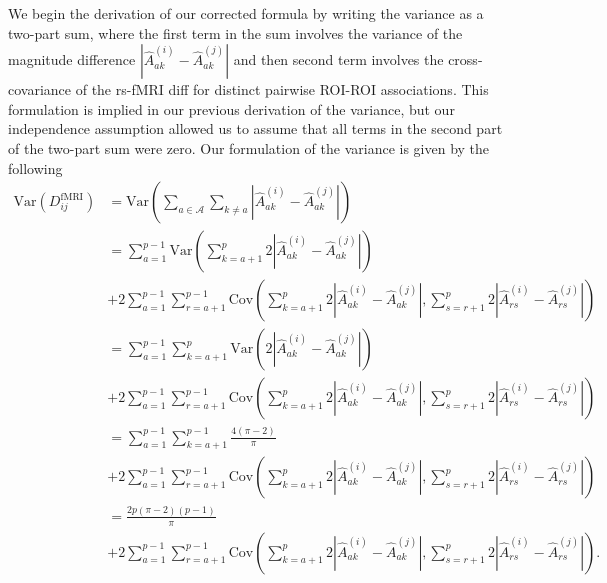 \documentclass[10pt,letterpaper]{article}
\begin{document}
We begin the derivation of our corrected formula by writing the variance as a two-part sum, where the first term in the sum involves the variance of the magnitude difference $|\hat{A}^{(i)}_{ak} - \hat{A}^{(j)}_{ak}|$ and then second term involves the cross-covariance of the rs-fMRI diff for distinct pairwise ROI-ROI associations. This formulation is implied in our previous derivation of the variance, but our independence assumption allowed us to assume that all terms in the second part of the two-part sum were zero. Our formulation of the variance is given by the following
%
\begin{equation}\label{eq:var_DDistr_rs-fMRI}
\begin{aligned}
\text{Var}(D^\text{fMRI}_{ij}) &= \text{Var}\left(\sum_{a \in \mathcal{A}} \sum_{k \neq a} \left|\hat{A}^{(i)}_{ak} - \hat{A}^{(j)}_{ak}\right|\right) \\
&= \sum_{a = 1}^{p-1} \text{Var}\left(\sum_{k=a+1}^{p} 2\left|\hat{A}^{(i)}_{ak} - \hat{A}^{(j)}_{ak}\right|\right) \\
&+ 2\sum_{a = 1}^{p-1} \sum_{r=a+1}^{p-1} \text{Cov}\left(\sum_{k=a+1}^{p} 2\left|\hat{A}^{(i)}_{ak} - \hat{A}^{(j)}_{ak}\right|, \sum_{s=r+1}^{p} 2\left|\hat{A}^{(i)}_{rs} - \hat{A}^{(j)}_{rs}\right|\right) \\
&= \sum_{a=1}^{p-1} \sum_{k=a+1}^{p} \text{Var}\left(2\left|\hat{A}^{(i)}_{ak} - \hat{A}^{(j)}_{ak}\right|\right) \\
&+ 2\sum_{a = 1}^{p-1} \sum_{r=a+1}^{p-1} \text{Cov}\left(\sum_{k=a+1}^{p} 2\left|\hat{A}^{(i)}_{ak} - \hat{A}^{(j)}_{ak}\right|, \sum_{s=r+1}^{p} 2\left|\hat{A}^{(i)}_{rs} - \hat{A}^{(j)}_{rs}\right|\right) \\
&= \sum_{a = 1}^{p-1} \sum_{k=a+1}^{p-1}\frac{4(\pi-2)}{\pi} \\
&+ 2\sum_{a = 1}^{p-1} \sum_{r=a+1}^{p-1} \text{Cov}\left(\sum_{k=a+1}^{p} 2\left|\hat{A}^{(i)}_{ak} - \hat{A}^{(j)}_{ak}\right|, \sum_{s=r+1}^{p} 2\left|\hat{A}^{(i)}_{rs} - \hat{A}^{(j)}_{rs}\right|\right) \\
&= \frac{2p(\pi-2)(p-1)}{\pi} \\
&+ 2\sum_{a = 1}^{p-1} \sum_{r=a+1}^{p-1} \text{Cov}\left(\sum_{k=a+1}^{p} 2\left|\hat{A}^{(i)}_{ak} - \hat{A}^{(j)}_{ak}\right|, \sum_{s=r+1}^{p} 2\left|\hat{A}^{(i)}_{rs} - \hat{A}^{(j)}_{rs}\right|\right).
\end{aligned}
\end{equation}
\end{document}
